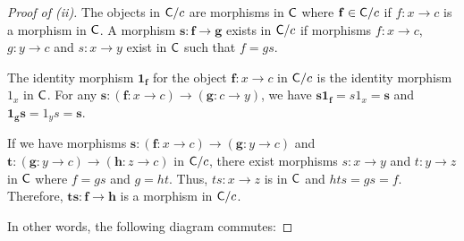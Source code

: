 \begin{proof}[Proof of (ii)]
The objects in $\mathsf{C}/c$ are morphisms in $\mathsf{C}$ where $\mathbf{f} \in \mathsf{C}/c$ if $f : x \rightarrow c$ is a morphism in $\mathsf{C}$.
A morphism $\mathbf{s}: \mathbf{f} \rightarrow \mathbf{g}$ exists in $\mathsf{C}/c$
if morphisms $f: x \rightarrow c$, $g:y \rightarrow c$ and $s:x \rightarrow y$ exist in $\mathsf{C}$ such that $f = gs$.

The identity morphism $\mathbf{1_f}$ for the object $\mathbf{f}: x \rightarrow c$ in $\mathsf{C}/c$ is the identity morphism $1_x$ in $\mathsf{C}$.
For any $\mathbf{s}: (\mathbf{f}: x \rightarrow c) \rightarrow (\mathbf{g}:c \rightarrow y)$, we have
$\mathbf{s}\mathbf{1_f} = s 1_x = \mathbf{s}$ and $\mathbf{1_g}\mathbf{s} = 1_y s = \mathbf{s}$.

If we have morphisms $\mathbf{s} : (\mathbf{f}: x \rightarrow c) \rightarrow (\mathbf{g}:y \rightarrow c)$ and
$\mathbf{t} : (\mathbf{g}: y \rightarrow c) \rightarrow (\mathbf{h}:z \rightarrow c)$ in $\mathsf{C}/c$, there exist morphisms
$s : x \rightarrow y$ and $t : y \rightarrow z$ in $\mathsf{C}$ where $f = gs$ and $g = ht$.
Thus, $ts: x \rightarrow z$ is in $\mathsf{C}$ and $hts = gs = f$.
Therefore, $\mathbf{ts}: \mathbf{f} \rightarrow \mathbf{h}$ is a morphism in $\mathsf{C}/c$.

In other words, the following diagram commutes:

\end{proof}

